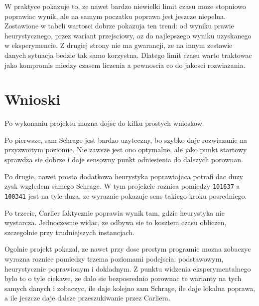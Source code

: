 \documentclass[12pt,a4paper]{article}
\begin{document}
W praktyce pokazuje to, ze nawet bardzo niewielki limit czasu moze stopniowo poprawiac wynik, ale na samym poczatku poprawa jest jeszcze niepelna. Zostawione w tabeli wartosci dobrze pokazuja ten trend: od wyniku prawie heurystycznego, przez wariant przejsciowy, az do najlepszego wyniku uzyskanego w eksperymencie. Z drugiej strony nie ma gwarancji, ze na innym zestawie danych sytuacja bedzie tak samo korzystna. Dlatego limit czasu warto traktowac jako kompromis miedzy czasem liczenia a pewnoscia co do jakosci rozwiazania.

\section{Wnioski}

Po wykonaniu projektu mozna dojsc do kilku prostych wnioskow.

Po pierwsze, sam Schrage jest bardzo uzyteczny, bo szybko daje rozwiazanie na przyzwoitym poziomie. Nie zawsze jest ono optymalne, ale jako punkt startowy sprawdza sie dobrze i daje sensowny punkt odniesienia do dalszych porownan.

Po drugie, nawet prosta dodatkowa heurystyka poprawiajaca potrafi dac duzy zysk wzgledem samego Schrage. W tym projekcie roznica pomiedzy \texttt{101637} a \texttt{100341} jest na tyle duza, ze wyraznie pokazuje sens takiego kroku posredniego.

Po trzecie, Carlier faktycznie poprawia wynik tam, gdzie heurystyka nie wystarcza. Jednoczesnie widac, ze odbywa sie to kosztem czasu obliczen, szczegolnie przy trudniejszych instancjach.

Ogolnie projekt pokazal, ze nawet przy dosc prostym programie mozna zobaczyc wyrazna roznice pomiedzy trzema poziomami podejscia: podstawowym, heurystycznie poprawionym i dokladnym. Z punktu widzenia eksperymentalnego bylo to o tyle ciekawe, ze dalo sie bezposrednio porownac te warianty na tych samych danych i zobaczyc, ile daje kolejno sam Schrage, ile daje lokalna poprawa, a ile jeszcze daje dalsze przeszukiwanie przez Carliera.
\end{document}
